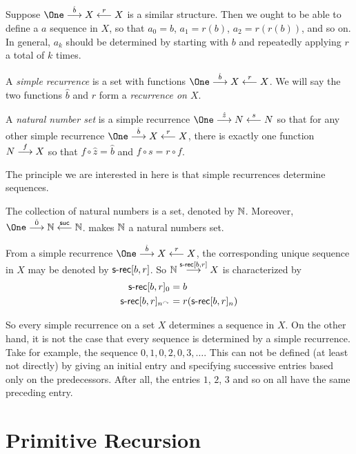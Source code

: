 Suppose $\One\stackrel{\hat{b}}{\longrightarrow}X\stackrel{r}{\longleftarrow}X$ is a similar structure.
Then we ought to be able to define a $a$ sequence in $X$, so that $a_0=b$, $a_1=r(b)$, $a_2=r(r(b))$, and so on. 
In general, $a_k$ should be determined by starting with $b$ and repeatedly applying $r$ a total of $k$ times. 

\begin{defn}\label{def:nno}
	A \emph{simple recurrence} is a set with functions $\One\stackrel{\hat{b}}{\longrightarrow}X\stackrel{r}{\longleftarrow}X$. We will say the two functions $\hat{b}$ and $r$ form a \emph{recurrence on $X$}.
	
	A \emph{natural number set} is a simple recurrence   $\One\stackrel{\hat{z}}{\longrightarrow}N\stackrel{s}{\longleftarrow}N$ so that for any other simple recurrence $\One\stackrel{\hat{b}}{\longrightarrow}X\stackrel{r}{\longleftarrow}X$, there is exactly one function $\sfromto fNX$ so that $f\circ \hat{z} =\hat b$ and $f\circ s = r\circ f$.
\end{defn}

The principle we are interested in here is that simple recurrences determine sequences.

\begin{principle}\label{ax:nat-numbers}
	The collection of natural numbers is a set, denoted by $\NN$.
	Moreover, $\One \stackrel{\hat{0}}{\longrightarrow} \NN \stackrel{\suc}{\longleftarrow} \NN$.
	makes $\NN$ a natural numbers set.
	
	From a simple recurrence $\One \stackrel{\hat{b}}{\longrightarrow} X \stackrel{r}{\longleftarrow} X$, the corresponding unique sequence in $X$
	may be denoted by $\srec[b,r]$. So $\sfromto {\srec[b,r]}\NN X$ is characterized by
	\begin{align*}
		\srec[b,r]_0 &= b\\
		\srec[b,r]_{n^\nxt} &= r(\srec[b,r]_n)
	\end{align*}
\end{principle}

So every simple recurrence on a set $X$ determines a sequence in $X$. 
On the other hand, it is not the case that every sequence is determined by a simple recurrence.
Take for example, the sequence $0,1,0,2,0,3,\ldots$. 
This can not be defined (at least not directly) by giving an initial entry and specifying successive entries based only on the predecessors. 
After all, the entries $1$, $2$, $3$ and so on all have the same preceding entry.


\section{Primitive Recursion}

